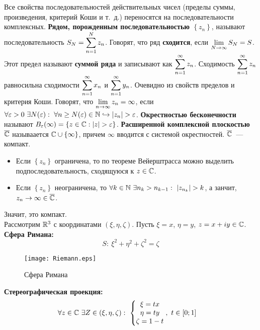 \corollary
Все свойства последовательностей действительных чисел (пределы суммы,
произведения, критерий Коши и т.~д.) переносятся на последовательности
комплексных.
\Def
\textbf{Рядом, порожденным последовательностью $\left\{ z_n \right\}$}, называют
последовательность $S_N = \displaystyle \sum_{n=1}^Nz_n$. Говорят, что ряд
\textbf{сходится}, если $\displaystyle \lim_{N \to \infty}S_N = S$. Этот предел называют
\textbf{суммой ряда} и записывают как $\displaystyle \sum_{n=1}^\infty z_n$.
\asm
Сходимость $\displaystyle \sum_{n=1}^\infty z_n$ равносильна сходимости $\displaystyle
\sum_{n=1}^\infty x_n$ и $\displaystyle \sum_{n=1}^\infty y_n$.
\pr
Очевидно из свойств пределов и критерия Коши.
\Def
Говорят, что $\displaystyle \lim_{n\to \infty}z_n = \infty$, если $\forall \varepsilon >
0 \ \exists N(\varepsilon): \ \forall n \geq N(\varepsilon)\in \NN \hookrightarrow
\left| z_n \right|> \varepsilon$. \textbf{Окрестностью бесконечности} называют
$B_\varepsilon(\infty) = \left\{ z \in \mathbb{C}: \left| z \right| > \varepsilon
\right\}$.
\Def
\textbf{Расширенной комплексной плоскостью} $\overline{\mathbb{C}}$ называается $\mathbb{C} \cup \left\{
    \infty \right\}$, причем $\infty$ вводится с системой окрестностей.
\Note
$\overline{\mathbb{C}}$~--- компакт.
\pr ~
\begin{itemize}
    \item Если $\left\{ z_n \right\}$ ограничена, то по теореме Вейерштрасса
    можно выделить подпоследовательность, сходящуюся к $z \in \mathbb{C}$.
    \item Если $\left\{ z_n \right\}$ неограничена, то $\forall k \in \mathbb{N}
    \ \exists n_k > n_{k-1}: \ \left| z_{n_k} \right| > k$, а занчит, $z_n \to
    \infty \in \overline{\mathbb{C}}$.
\end{itemize}
Значит, это компакт.
\\
Рассмотрим $\mathbb{R}^3$ с координатами $(\xi, \eta, \zeta)$. Пусть $\xi = x$, $\eta =
y$, $z = x+iy \in \mathbb{C}$.
\Def
\textbf{Сфера Римана:}
\begin{equation}\label{(2.2)}
    S: \ \xi^2+\eta^2+\zeta^2 = \zeta
\end{equation}
\begin{figure}[h!]
		\centering
		\texttt{[image: Riemann.eps]}
    \caption{Сфера Римана}
		\label{fig:2.1}
\end{figure}
\Def
\textbf{Стереографическая проекция:}
\begin{align*}
  & \forall z \in \mathbb{C} \ \exists Z \in (\xi, \eta, \zeta): \ \left\{ \begin{matrix}
          \xi = tx \\
          \eta = ty \\
          \zeta = 1-t
      \end{matrix} \right., \ t \in [0;1]
\end{align*}
